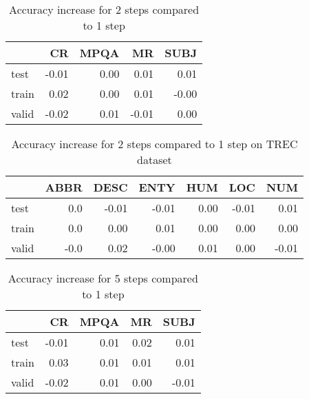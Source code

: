 


\begin{table}[H]
\begin{center}

\begin{tabular}{lrrrr}
\toprule
{} &  CR &  MPQA &  MR &  SUBJ \\
\midrule
test  &  -0.01 &   0.00 &   0.01 &   0.01 \\
train &   0.02 &   0.00 &   0.01 &    -0.00 \\
valid &  -0.02 &   0.01 &  -0.01 &   0.00 \\
\bottomrule
\end{tabular}

\caption[Accuracy increase for 2 steps compared to 1 step]{Accuracy increase for 2 steps compared to 1 step}
\label{tab:multiw:notrec:2}
\end{center}
\end{table}




\begin{table}[H]
\begin{center}

\begin{tabular}{lrrrrrr}
\toprule
{} &  ABBR &  DESC &  ENTY &  HUM &  LOC &  NUM \\
\midrule
test  &     0.0 &     -0.01 &     -0.01 &     0.00 &    -0.01 &     0.01 \\
train &     0.0 &      0.00 &      0.01 &     0.00 &     0.00 &     0.00 \\
valid &      -0.0 &      0.02 &     -0.00 &     0.01 &     0.00 &    -0.01 \\
\bottomrule
\end{tabular}

\caption[Accuracy increase for 2 steps compared to 1 step on TREC dataset]{Accuracy increase for 2 steps compared to 1 step on TREC dataset}
\label{tab:multiw:trec:2}
\end{center}
\end{table}




\begin{table}[H]
\begin{center}

\begin{tabular}{lrrrr}
\toprule
{} &  CR &  MPQA &  MR &  SUBJ \\
\midrule
test  &  -0.01 &   0.01 &   0.02 &   0.01 \\
train &   0.03 &   0.01 &   0.01 &   0.01 \\
valid &  -0.02 &   0.01 &   0.00 &    -0.01 \\
\bottomrule
\end{tabular}

\caption[Accuracy increase for 5 steps compared to 1 step]{Accuracy increase for 5 steps compared to 1 step}
\label{tab:multiw:notrec:5}
\end{center}
\end{table}




